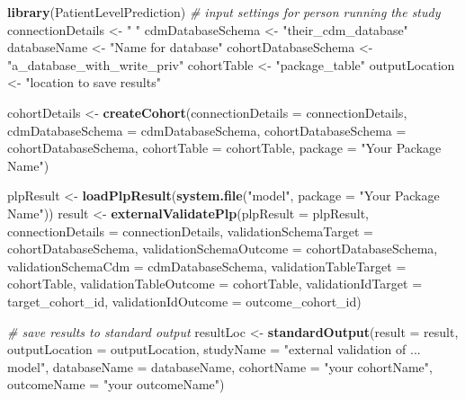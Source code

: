 \documentclass[]{article}
\newenvironment{Shaded}{\begin{snugshade}}{\end{snugshade}}
\newcommand{\KeywordTok}[1]{\textcolor[rgb]{0.13,0.29,0.53}{\textbf{#1}}}
\newcommand{\DataTypeTok}[1]{\textcolor[rgb]{0.13,0.29,0.53}{#1}}
\newcommand{\StringTok}[1]{\textcolor[rgb]{0.31,0.60,0.02}{#1}}
\newcommand{\CommentTok}[1]{\textcolor[rgb]{0.56,0.35,0.01}{\textit{#1}}}
\newcommand{\NormalTok}[1]{#1}
\begin{document}
\begin{Shaded}
\begin{Highlighting}[]
\KeywordTok{library}\NormalTok{(PatientLevelPrediction)}
\CommentTok{# input settings for person running the study}
\NormalTok{connectionDetails <-}\StringTok{ " "}
\NormalTok{cdmDatabaseSchema <-}\StringTok{ "their_cdm_database"}
\NormalTok{databaseName <-}\StringTok{ "Name for database"}
\NormalTok{cohortDatabaseSchema <-}\StringTok{ "a_database_with_write_priv"}
\NormalTok{cohortTable <-}\StringTok{ "package_table"}
\NormalTok{outputLocation <-}\StringTok{ "location to save results"}

\NormalTok{cohortDetails <-}\StringTok{ }\KeywordTok{createCohort}\NormalTok{(}\DataTypeTok{connectionDetails =}\NormalTok{ connectionDetails, }\DataTypeTok{cdmDatabaseSchema =}\NormalTok{ cdmDatabaseSchema, }
    \DataTypeTok{cohortDatabaseSchema =}\NormalTok{ cohortDatabaseSchema, }\DataTypeTok{cohortTable =}\NormalTok{ cohortTable, }
    \DataTypeTok{package =} \StringTok{"Your Package Name"}\NormalTok{)}

\NormalTok{plpResult <-}\StringTok{ }\KeywordTok{loadPlpResult}\NormalTok{(}\KeywordTok{system.file}\NormalTok{(}\StringTok{"model"}\NormalTok{, }\DataTypeTok{package =} \StringTok{"Your Package Name"}\NormalTok{))}
\NormalTok{result <-}\StringTok{ }\KeywordTok{externalValidatePlp}\NormalTok{(}\DataTypeTok{plpResult =}\NormalTok{ plpResult, }\DataTypeTok{connectionDetails =}\NormalTok{ connectionDetails, }
    \DataTypeTok{validationSchemaTarget =}\NormalTok{ cohortDatabaseSchema, }\DataTypeTok{validationSchemaOutcome =}\NormalTok{ cohortDatabaseSchema, }
    \DataTypeTok{validationSchemaCdm =}\NormalTok{ cdmDatabaseSchema, }\DataTypeTok{validationTableTarget =}\NormalTok{ cohortTable, }
    \DataTypeTok{validationTableOutcome =}\NormalTok{ cohortTable, }\DataTypeTok{validationIdTarget =}\NormalTok{ target_cohort_id, }
    \DataTypeTok{validationIdOutcome =}\NormalTok{ outcome_cohort_id)}

\CommentTok{# save results to standard output}
\NormalTok{resultLoc <-}\StringTok{ }\KeywordTok{standardOutput}\NormalTok{(}\DataTypeTok{result =}\NormalTok{ result, }\DataTypeTok{outputLocation =}\NormalTok{ outputLocation, }
    \DataTypeTok{studyName =} \StringTok{"external validation of ... model"}\NormalTok{, }\DataTypeTok{databaseName =}\NormalTok{ databaseName, }
    \DataTypeTok{cohortName =} \StringTok{"your cohortName"}\NormalTok{, }\DataTypeTok{outcomeName =} \StringTok{"your outcomeName"}\NormalTok{)}


\end{Highlighting}
\end{Shaded}
\end{document}
